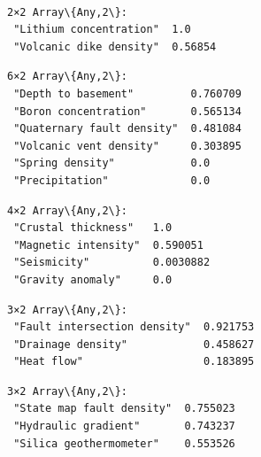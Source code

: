 \documentclass[11pt]{article}
\begin{document}
    \begin{Verbatim}[commandchars=\\\{\}]

    \end{Verbatim}

    \begin{center}
    \end{center}
    { \hspace*{\fill} \\}
    
    \begin{Verbatim}[commandchars=\\\{\}]

    \end{Verbatim}

    
    \begin{Verbatim}[commandchars=\\\{\}]
2×2 Array\{Any,2\}:
 "Lithium concentration"  1.0
 "Volcanic dike density"  0.56854
    \end{Verbatim}

    
    
    \begin{Verbatim}[commandchars=\\\{\}]
6×2 Array\{Any,2\}:
 "Depth to basement"         0.760709
 "Boron concentration"       0.565134
 "Quaternary fault density"  0.481084
 "Volcanic vent density"     0.303895
 "Spring density"            0.0
 "Precipitation"             0.0
    \end{Verbatim}

    
    
    \begin{Verbatim}[commandchars=\\\{\}]
4×2 Array\{Any,2\}:
 "Crustal thickness"   1.0
 "Magnetic intensity"  0.590051
 "Seismicity"          0.0030882
 "Gravity anomaly"     0.0
    \end{Verbatim}

    
    
    \begin{Verbatim}[commandchars=\\\{\}]
3×2 Array\{Any,2\}:
 "Fault intersection density"  0.921753
 "Drainage density"            0.458627
 "Heat flow"                   0.183895
    \end{Verbatim}

    
    
    \begin{Verbatim}[commandchars=\\\{\}]
3×2 Array\{Any,2\}:
 "State map fault density"  0.755023
 "Hydraulic gradient"       0.743237
 "Silica geothermometer"    0.553526
    \end{Verbatim}
\end{document}
